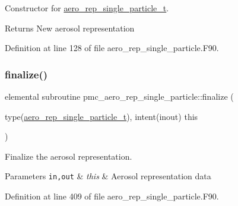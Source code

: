 Constructor for \mbox{\hyperlink{structpmc__aero__rep__single__particle_1_1aero__rep__single__particle__t}{aero\+\_\+rep\+\_\+single\+\_\+particle\+\_\+t}}. 

\begin{DoxyReturn}{Returns}
New aerosol representation 
\end{DoxyReturn}


Definition at line 128 of file aero\+\_\+rep\+\_\+single\+\_\+particle.\+F90.

\mbox{\label{namespacepmc__aero__rep__single__particle_aa3414449aefecf962c845663fbd25826}} 
\subsubsection{\texorpdfstring{finalize()}{finalize()}}
{\footnotesize\ttfamily elemental subroutine pmc\+\_\+aero\+\_\+rep\+\_\+single\+\_\+particle\+::finalize (\begin{DoxyParamCaption}\item[{type(\mbox{\hyperlink{structpmc__aero__rep__single__particle_1_1aero__rep__single__particle__t}{aero\+\_\+rep\+\_\+single\+\_\+particle\+\_\+t}}), intent(inout)}]{this }\end{DoxyParamCaption})\hspace{0.3cm}{\ttfamily [private]}}



Finalize the aerosol representation. 


\begin{DoxyParams}[1]{Parameters}
\mbox{\tt in,out}  & {\em this} & Aerosol representation data \\
\hline
\end{DoxyParams}


Definition at line 409 of file aero\+\_\+rep\+\_\+single\+\_\+particle.\+F90.

\mbox{\label{namespacepmc__aero__rep__single__particle_a9f4a932c43b2ac0c227a2695be56837a}} 
